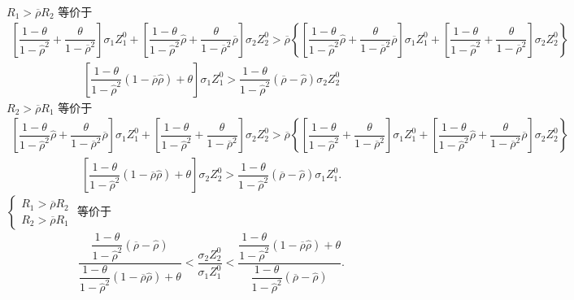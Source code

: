 \documentclass[10.0pt]{article}
\begin{document}
$ R_1 > \overline{\rho} R_2 $ 等价于 
{\footnotesize \begin{eqnarray*}
\left[ \dfrac{1 - \theta}{1 - {\hat \rho}^2} + \dfrac{\theta}{1 - \overline{\rho}^2} \right] \sigma_1 Z_1^0 + \left[ \dfrac{1 - \theta}{1 - {\hat \rho}^2} {\hat \rho} + \dfrac{\theta}{1 - \overline{\rho}^2} \overline{\rho} \right] \sigma_2 Z_2^0 > \overline{\rho} \left\{ \left[ \dfrac{1 - \theta}{1 - {\hat \rho}^2} {\hat \rho} + \dfrac{\theta}{1 - \overline{\rho}^2} \overline{\rho} \right] \sigma_1 Z_1^0 + \left[ \dfrac{1 - \theta}{1 - {\hat \rho}^2} + \dfrac{\theta}{1 - \overline{\rho}^2} \right] \sigma_2 Z_2^0 \right\}
\end{eqnarray*}}
\begin{eqnarray*}
\left[ \dfrac{1 - \theta}{1 - {\hat \rho}^2} (1 - \overline{\rho} {\hat \rho}) + \theta \right] \sigma_1 Z_1^0 > \dfrac{1 - \theta}{1 - {\hat \rho}^2} (\overline{\rho} - {\hat \rho}) \sigma_2 Z_2^0
\end{eqnarray*}
$ R_2 > \overline{\rho} R_1 $ 等价于 
{\footnotesize \begin{eqnarray*}
\left[ \dfrac{1 - \theta}{1 - {\hat \rho}^2} {\hat \rho} + \dfrac{\theta}{1 - \overline{\rho}^2} \overline{\rho} \right] \sigma_1 Z_1^0 + \left[ \dfrac{1 - \theta}{1 - {\hat \rho}^2} + \dfrac{\theta}{1 - \overline{\rho}^2} \right] \sigma_2 Z_2^0 > \overline{\rho} \left\{ \left[ \dfrac{1 - \theta}{1 - {\hat \rho}^2} + \dfrac{\theta}{1 - \overline{\rho}^2} \right] \sigma_1 Z_1^0 + \left[ \dfrac{1 - \theta}{1 - {\hat \rho}^2} {\hat \rho} + \dfrac{\theta}{1 - \overline{\rho}^2} \overline{\rho} \right] \sigma_2 Z_2^0 \right\}
\end{eqnarray*}}
\begin{eqnarray*}
\left[ \dfrac{1 - \theta}{1 - {\hat \rho}^2} (1 - \overline{\rho} {\hat \rho}) + \theta \right] \sigma_2 Z_2^0 > \dfrac{1 - \theta}{1 - {\hat \rho}^2} (\overline{\rho} - {\hat \rho}) \sigma_1 Z_1^0.
\end{eqnarray*}
$ \left\{ \begin{matrix} R_1 > \overline{\rho} R_2 \\ R_2 > \overline{\rho} R_1 \end{matrix} \right. $ 等价于 
\begin{eqnarray*}
\dfrac{\dfrac{1 - \theta}{1 - {\hat \rho}^2} (\overline{\rho} - {\hat \rho})}{\dfrac{1 - \theta}{1 - {\hat \rho}^2} (1 - \overline{\rho} {\hat \rho}) + \theta} < \dfrac{\sigma_2 Z_2^0}{\sigma_1 Z_1^0} < \dfrac{\dfrac{1 - \theta}{1 - {\hat \rho}^2} (1 - \overline{\rho} {\hat \rho}) + \theta}{\dfrac{1 - \theta}{1 - {\hat \rho}^2} (\overline{\rho} - {\hat \rho})}.
\end{eqnarray*}
\end{document}
